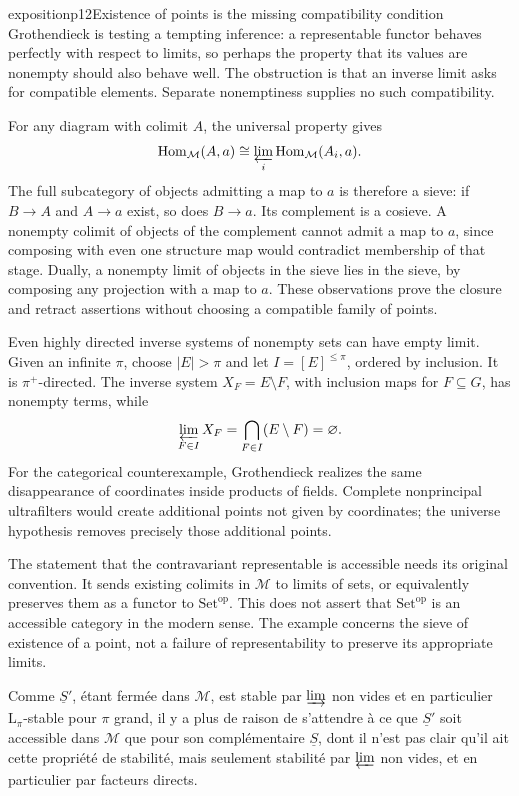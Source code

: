 \begin{dcomment}{exposition}{p12}{Existence of points is the missing compatibility condition}
Grothendieck is testing a tempting inference: a representable functor behaves perfectly with respect to limits, so perhaps the property that its values are nonempty should also behave well. The obstruction is that an inverse limit asks for compatible elements. Separate nonemptiness supplies no such compatibility.

For any diagram with colimit $A$, the universal property gives
\[
 \operatorname{Hom}_{\mathcal M}(A,a)
   \cong\varprojlim_i\operatorname{Hom}_{\mathcal M}(A_i,a).
\]
The full subcategory of objects admitting a map to $a$ is therefore a sieve: if $B\to A$ and $A\to a$ exist, so does $B\to a$. Its complement is a cosieve. A nonempty colimit of objects of the complement cannot admit a map to $a$, since composing with even one structure map would contradict membership of that stage. Dually, a nonempty limit of objects in the sieve lies in the sieve, by composing any projection with a map to $a$. These observations prove the closure and retract assertions without choosing a compatible family of points.

Even highly directed inverse systems of nonempty sets can have empty limit. Given an infinite $\pi$, choose $|E|>\pi$ and let $I=[E]^{\le\pi}$, ordered by inclusion. It is $\pi^+$-directed. The inverse system $X_F=E\setminus F$, with inclusion maps for $F\subseteq G$, has nonempty terms, while
\[
 \varprojlim_{F\in I}X_F
    =\bigcap_{F\in I}(E\setminus F)=\varnothing.
\]
For the categorical counterexample, Grothendieck realizes the same disappearance of coordinates inside products of fields. Complete nonprincipal ultrafilters would create additional points not given by coordinates; the universe hypothesis removes precisely those additional points.

The statement that the contravariant representable is accessible needs its original convention. It sends existing colimits in $\mathcal M$ to limits of sets, or equivalently preserves them as a functor to $\mathrm{Set}^{\mathrm{op}}$. This does not assert that $\mathrm{Set}^{\mathrm{op}}$ is an accessible category in the modern sense. The example concerns the sieve of existence of a point, not a failure of representability to preserve its appropriate limits.
\end{dcomment}


Comme $\underline{S}'$, étant fermée dans $\mathcal{M}$, est stable par $\mathop{\underrightarrow{\mathrm{lim}}}$ non vides et en particulier $\mathrm{L}_\pi$-stable pour $\pi$ grand, il y a plus de raison de s'attendre à ce que $\underline{S}'$ soit accessible dans $\mathcal{M}$ que pour son complémentaire $\underline{S}$, dont il n'est pas clair qu'il ait cette propriété de stabilité, mais seulement stabilité par $\mathop{\underleftarrow{\mathrm{lim}}}$ non vides, et en particulier par facteurs directs.

